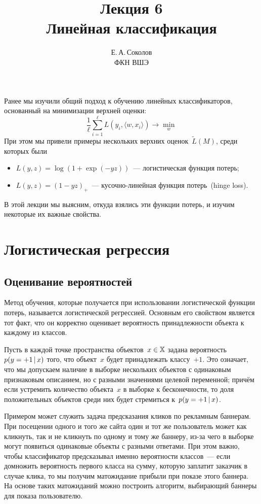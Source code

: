 \documentclass[12pt,fleqn]{article}
\begin{document}
\title{Лекция 6\\Линейная классификация}
\author{Е.\,А.\,Соколов\\ФКН ВШЭ}
\maketitle

Ранее мы изучили общий подход к обучению линейных классификаторов, основанный на минимизации
верхней оценки:
\[
    \frac{1}{\ell}
    \sum_{i = 1}^{\ell}
        L(y_i, \langle w, x_i \rangle)
    \to
    \min_{w}
\]
При этом мы привели примеры нескольких верхних оценок~$\tilde L(M)$,
среди которых были
\begin{itemize}
    \item $L(y, z) = \log(1 + \exp(-yz))$~--- логистическая функция потерь;
    \item $L(y, z) = (1 - yz)_+$~--- кусочно-линейная функция потерь~(hinge loss).
\end{itemize}
В этой лекции мы выясним, откуда взялись эти функции потерь, и изучим некоторые их важные свойства.

\section{Логистическая регрессия}
\subsection{Оценивание вероятностей}
Метод обучения, которые получается при использовании логистической функции потерь,
называется логистической регрессией.
Основным его свойством является тот факт, что он корректно оценивает вероятность
принадлежности объекта к каждому из классов.

Пусть в каждой точке пространства объектов~$x \in \mathbb{X}$ задана вероятность~$p(y = +1 \mspace{3mu}{|}\mspace{3mu} x)$
того, что объект~$x$ будет принадлежать классу~$+1$.
Это означает, что мы допускаем наличие в выборке нескольких объектов
с одинаковым признаковым описанием, но с разными значениями целевой переменной;
причём если устремить количество объекта~$x$ в выборке к бесконечности,
то доля положительных объектов среди них будет стремиться к~$p(y = +1 \mspace{3mu}{|}\mspace{3mu} x)$.

Примером может служить задача предсказания кликов по рекламным баннерам.
При посещении одного и того же сайта один и тот же пользователь может как кликнуть,
так и не кликнуть по одному и тому же баннеру,
из-за чего в выборке могут появиться одинаковые объекты с разными ответами.
При этом важно, чтобы классификатор предсказывал именно вероятности классов~---
если домножить вероятность первого класса на сумму, которую заплатит заказчик в случае клика,
то мы получим матожидание прибыли при показе этого баннера.
На основе таких матожиданий можно построить алгоритм, выбирающий
баннеры для показа пользователю.
\end{document}
